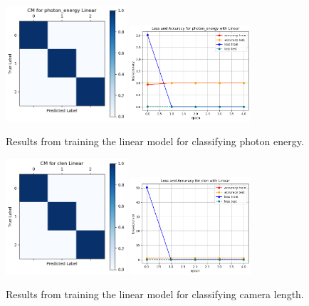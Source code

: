 \documentclass[12pt]{article}
\begin{document}
\begin{figure}[H]
    \centering
    \includegraphics[width=0.4\textwidth]{confusion_matrix/photon_cm.png}
    \includegraphics[width=0.4\textwidth]{loss_plot/photon_loss.png}
    \caption{Results from training the linear model for classifying photon energy.}
    \label{fig:photon_energy_results}
\end{figure}

\begin{figure}[H]
    \centering
    \includegraphics[width=0.4\textwidth]{confusion_matrix/camera_cm.png}
    \includegraphics[width=0.4\textwidth]{loss_plot/camera_loss.png}
    \caption{Results from training the linear model for classifying camera length.}
    \label{fig:photon_energy_results}
\end{figure}
\end{document}
